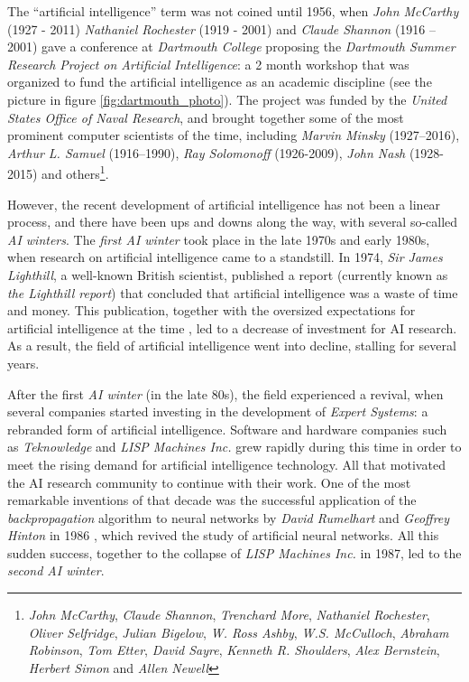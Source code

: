 The ``artificial intelligence'' term was not coined until 1956, when \textit{John McCarthy} (1927 - 2011) \textit{Nathaniel Rochester} (1919 - 2001) and \textit{Claude Shannon} (1916 – 2001) gave a conference at \textit{Dartmouth College} proposing the \textit{Dartmouth Summer Research Project on Artificial Intelligence}: a 2 month workshop that was organized to fund the artificial intelligence as an academic discipline (see the picture in figure \ref{fig:dartmouth_photo}). The project was funded by the \textit{United States Office of Naval Research}, and brought together some of the most prominent computer scientists of the time, including \textit{Marvin Minsky} (1927–2016), \textit{Arthur L. Samuel} (1916–1990), \textit{Ray Solomonoff} (1926-2009),  \textit{John Nash} (1928-2015) and others\footnote{\textit{John McCarthy}, \textit{Claude Shannon}, \textit{Trenchard More}, \textit{Nathaniel Rochester}, \textit{Oliver Selfridge}, \textit{Julian Bigelow}, \textit{W. Ross Ashby}, \textit{W.S. McCulloch}, \textit{Abraham Robinson}, \textit{Tom Etter},  \textit{David Sayre}, \textit{Kenneth R. Shoulders}, \textit{Alex Bernstein}, \textit{Herbert Simon} and \textit{Allen Newell}}.

However, the recent development of artificial intelligence has not been a linear process, and there have been ups and downs along the way, with several so-called \textit{AI winters}. The \textit{first AI winter} took place in the late 1970s and early 1980s, when research on artificial intelligence came to a standstill. In 1974, \textit{Sir James Lighthill}, a well-known British scientist, published a report \autocite{lighthillReport} (currently known as \textit{the Lighthill report}) that concluded that artificial intelligence was a waste of time and money. This publication, together with the oversized expectations for artificial intelligence at the time \autocite{russellNorvig}, led to a decrease of investment for AI research. As a result, the field of artificial intelligence went into decline, stalling for several years.

After the first \textit{AI winter} (in the late 80s), the field experienced a revival, when several companies started investing in the development of \textit{Expert Systems}: a rebranded form of artificial intelligence. Software and hardware companies such as \textit{Teknowledge} and \textit{LISP Machines Inc.} grew rapidly during this time in order to meet the rising demand for artificial intelligence technology. All that motivated the AI research community to continue with their work. One of the most remarkable inventions of that decade was the successful application of the \textit{backpropagation} algorithm to neural networks by \textit{David Rumelhart} and \textit{Geoffrey Hinton} in 1986 \autocite{hinton1986}, which revived the study of artificial neural networks. All this sudden success, together to the collapse of \textit{LISP Machines Inc.} in 1987, led to the \textit{second AI winter}.


